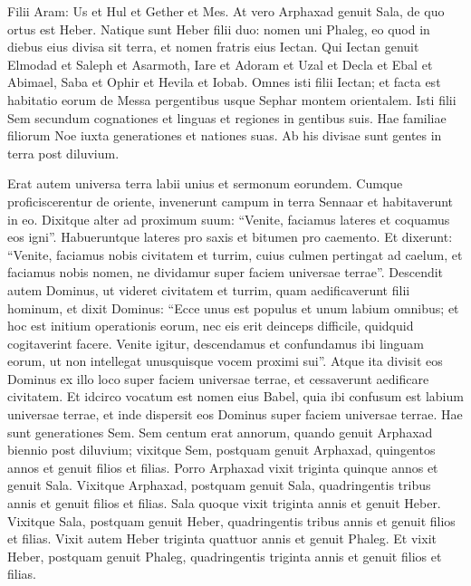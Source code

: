 \begin{biblechapter}
\begin{biblechapter}
\begin{biblechapter}
\begin{biblechapter}
\begin{biblechapter}
\begin{biblechapter}
\begin{biblechapter}
\begin{biblechapter}
\begin{biblechapter}
\begin{biblechapter}
\verse Filii Aram: Us et Hul et Gether et Mes. 
\verse At vero Arphaxad genuit Sala, de quo ortus est Heber. 
\verse Natique sunt Heber filii duo: nomen uni Phaleg, eo quod in diebus eius divisa sit terra, et nomen fratris eius Iectan. 
\verse Qui Iectan genuit Elmodad et Saleph et Asarmoth, Iare 
\verse et Adoram et Uzal et Decla 
\verse et Ebal et Abimael, Saba 
\verse et Ophir et Hevila et Iobab. Omnes isti filii Iectan; 
\verse et facta est habitatio eorum de Messa pergentibus usque Sephar montem orientalem.
 \verse Isti filii Sem secundum cognationes et linguas et regiones in gentibus suis.
 \verse Hae familiae filiorum Noe iuxta generationes et nationes suas. Ab his divisae sunt gentes in terra post diluvium.
 
\begin{biblechapter}
\verse Erat autem universa terra labii unius et sermonum eorundem. 
\verse Cumque proficiscerentur de oriente, invenerunt campum in terra Sennaar et habitaverunt in eo. 
\verse Dixitque alter ad proximum suum: “Venite, faciamus lateres et coquamus eos igni”. Habueruntque lateres pro saxis et bitumen pro caemento. 
 \verse Et dixerunt: “Venite, faciamus nobis civitatem et turrim, cuius culmen pertingat ad caelum, et faciamus nobis nomen, ne dividamur super faciem universae terrae”.
 \verse Descendit autem Dominus, ut videret civitatem et turrim, quam aedificaverunt filii hominum, 
\verse et dixit Dominus: “Ecce unus est populus et unum labium omnibus; et hoc est initium operationis eorum, nec eis erit deinceps difficile, quidquid cogitaverint facere. 
\verse Venite igitur, descendamus et confundamus ibi linguam eorum, ut non intellegat unusquisque vocem proximi sui”. 
\verse Atque ita divisit eos Dominus ex illo loco super faciem universae terrae, et cessaverunt aedificare civitatem. 
\verse Et idcirco vocatum est nomen eius Babel, quia ibi confusum est labium universae terrae, et inde dispersit eos Dominus super faciem universae terrae.
 \verse Hae sunt generationes Sem. Sem centum erat annorum, quando genuit Arphaxad biennio post diluvium; 
\verse vixitque Sem, postquam genuit Arphaxad, quingentos annos et genuit filios et filias.
 \verse Porro Arphaxad vixit triginta quinque annos et genuit Sala. 
\verse Vixitque Arphaxad, postquam genuit Sala, quadringentis tribus annis et genuit filios et filias.
\verse Sala quoque vixit triginta annis et genuit Heber. 
\verse Vixitque Sala, postquam genuit Heber, quadringentis tribus annis et genuit filios et filias.
\verse Vixit autem Heber triginta quattuor annis et genuit Phaleg. 
\verse Et vixit Heber, postquam genuit Phaleg, quadringentis triginta annis et genuit filios et filias.

\end{biblechapter}
\end{biblechapter}
\end{biblechapter}
\end{biblechapter}
\end{biblechapter}
\end{biblechapter}
\end{biblechapter}
\end{biblechapter}
\end{biblechapter}
\end{biblechapter}
\end{biblechapter}
